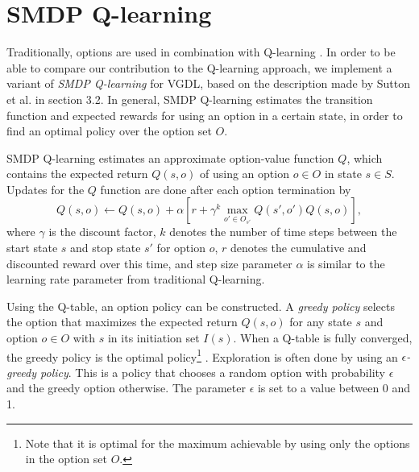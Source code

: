 \chapter{SMDP Q-learning}

Traditionally, options are used in combination with Q-learning
\cite{sutton1999between}. In order to be able to compare our contribution to the
Q-learning approach, we implement a variant of \emph{SMDP Q-learning} for VGDL,
based on the description made by Sutton et al. in section 3.2. In general, SMDP
Q-learning estimates the transition function and expected rewards for using an
option in a certain state, in order to find an optimal policy over the option
set $O$.

SMDP Q-learning estimates an approximate option-value function $Q$, which
contains the expected return $Q(s, o)$ of using an option $o \in O$ in state $s
\in S$. Updates for the $Q$ function are done after each option termination by
\begin{equation}
	\label{eq:qlearning}
	Q(s, o) \gets Q(s, o) + \alpha \left[r + \gamma^k \max_{o' \in O_{s'}}Q(s',
	o') Q(s, o)\right],
\end{equation}
where $\gamma$ is the discount factor, $k$ denotes the number of time steps
between the start state $s$ and stop state $s'$ for option $o$, $r$ denotes
the cumulative and discounted reward over this time, and step size parameter
$\alpha$ is similar to the learning rate parameter from traditional Q-learning.

Using the Q-table, an option policy can be constructed. A \emph{greedy policy}
selects the option that maximizes the expected return $Q(s, o)$ for any state
$s$ and option $o \in O$ with $s$ in its initiation set $I(s)$. When a Q-table
is fully converged, the greedy policy is the optimal policy\footnote{Note that
it is optimal for the maximum achievable by using only the options in the option
set $O$.} \cite{sutton1999between}. Exploration is often done by using an
\emph{$\epsilon$-greedy policy}. This is a policy that chooses a random option
with probability $\epsilon$ and the greedy option otherwise. The parameter
$\epsilon$ is set to a value between 0 and 1.

